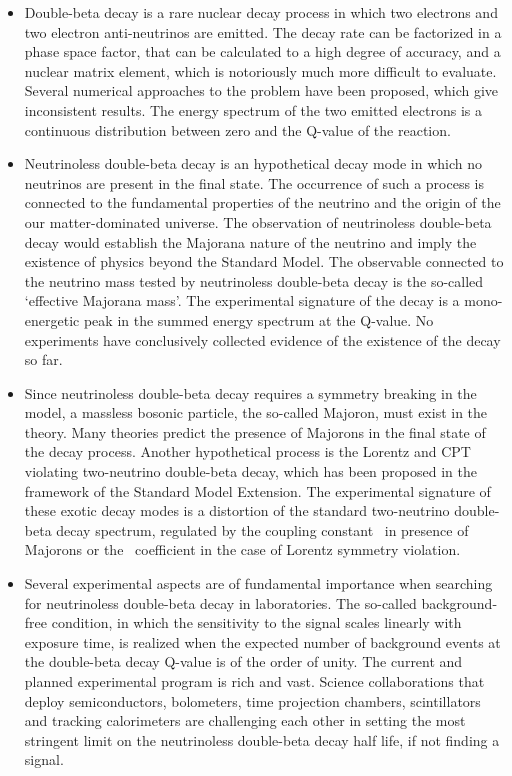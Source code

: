\chapsummary
\begin{itemize}
  \item Double-beta decay is a rare nuclear decay process in which two electrons and two
    electron anti-neutrinos are emitted. The decay rate can be factorized in a phase space
    factor, that can be calculated to a high degree of accuracy, and a nuclear matrix
    element, which is notoriously much more difficult to evaluate. Several numerical
    approaches to the problem have been proposed, which give inconsistent results. The
    energy spectrum of the two emitted electrons is a continuous distribution between zero
    and the Q-value of the reaction.
  \item Neutrinoless double-beta decay is an hypothetical decay mode in which no neutrinos
    are present in the final state. The occurrence of such a process is connected to the
    fundamental properties of the neutrino and the origin of the our matter-dominated
    universe. The observation of neutrinoless double-beta decay would establish the
    Majorana nature of the neutrino and imply the existence of physics beyond the Standard
    Model. The observable connected to the neutrino mass tested by neutrinoless
    double-beta decay is the so-called `effective Majorana mass'. The experimental
    signature of the decay is a mono-energetic peak in the summed energy spectrum at the
    Q-value. No experiments have conclusively collected evidence of the existence of the
    decay so far.
  \item Since neutrinoless double-beta decay requires a symmetry breaking in the model, a
    massless bosonic particle, the so-called Majoron, must exist in the theory. Many
    theories predict the presence of Majorons in the final state of the decay process.
    Another hypothetical process is the Lorentz and CPT violating two-neutrino double-beta
    decay, which has been proposed in the framework of the Standard Model Extension. The
    experimental signature of these exotic decay modes is a distortion of the standard
    two-neutrino double-beta decay spectrum, regulated by the coupling constant \ga\ in
    presence of Majorons or the \aof\ coefficient in the case of Lorentz symmetry
    violation.
  \item Several experimental aspects are of fundamental importance when searching for
    neutrinoless double-beta decay in laboratories. The so-called background-free
    condition, in which the sensitivity to the signal scales linearly with exposure time,
    is realized when the expected number of background events at the double-beta decay
    Q-value is of the order of unity. The current and planned experimental program is rich
    and vast. Science collaborations that deploy semiconductors, bolometers, time projection
    chambers, scintillators and tracking calorimeters are challenging each other in
    setting the most stringent limit on the neutrinoless double-beta decay half life, if
    not finding a signal.
\end{itemize}


